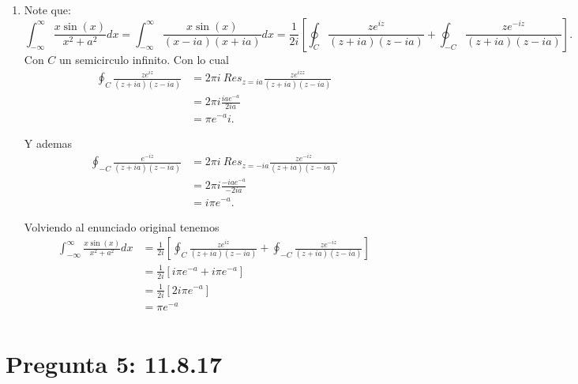 \documentclass{report}
\begin{document}
\begin{enumerate}
  \item Note que: \[
      \displaystyle\int_{-\infty}^{\infty}\frac{x\sin\left( x \right) }{x^2 + a^2}dx = \displaystyle\int_{-\infty}^{\infty}\frac{x\sin\left( x \right) }{\left( x - ia \right)\left( x + ia \right)  }dx = \frac{1}{2i} \left[\oint_{C}   \frac{ze^{iz}}{\left( z + ia \right) \left( z - ia \right) } + \oint_{-C} \frac{ze^{-iz}}{\left( z + ia \right) \left( z - ia \right) }\right] 
      .\] Con $C$ un semicirculo infinito.
    Con lo cual
    \begin{align*}
      \oint_{C} \frac{ze^{iz}}{\left( z + ia \right) \left( z - ia \right) } &= 2\pi i\ Res_{z = ia}\frac{ze^{izz}}{\left( z + ia \right) \left( z - ia \right) } \\
      &= 2\pi i \frac{iae^{-a}}{2ia} \\
      &= \pi e^{-a}i
    .\end{align*}

    Y ademas
    \begin{align*}
      \oint_{-C} \frac{e^{-iz}}{\left( z + ia \right) \left( z - ia \right) } &= 2 \pi i\ Res_{z = -ia} \frac{ze^{-iz}}{\left( z + ia \right)\left( z - ia \right)  }\\
      &= 2 \pi i \frac{-ia e^{-a}}{-2ia} \\
      &= i \pi e^{-a}
    .\end{align*}

    Volviendo al enunciado original tenemos
    \begin{align*}
      \displaystyle\int_{-\infty}^{\infty}\frac{x\sin\left( x \right) }{x^2 + a^2}dx &= \frac{1}{2i} \left[\oint_{C}   \frac{ze^{iz}}{\left( z + ia \right) \left( z - ia \right) } + \oint_{-C} \frac{ze^{-iz}}{\left( z + ia \right) \left( z - ia \right) }\right]\\
      &= \frac{1}{2i}\left[ i\pi e^{-a} + i \pi e^{-a} \right]  \\
      &= \frac{1}{2i}\left[ 2i\pi e^{-a} \right]  \\
      &= \pi e^{-a} \\
    \end{align*}

\end{enumerate}

\chapter{Pregunta 5: 11.8.17}

\end{document}

